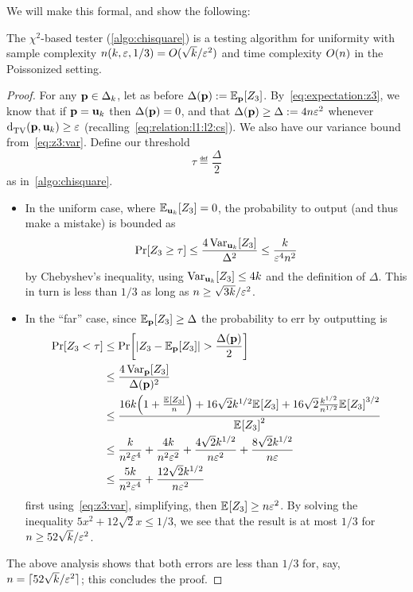 We will make this formal, and show the following:
\begin{theorem}
  \label{theo:z3}
The $\chi^2$-based tester (\cref{algo:chisquare}) is a testing algorithm for uniformity with sample complexity $n(k,\varepsilon,1/3) = O(\sqrt{k}/\varepsilon^2)$ and time complexity $O(n)$ in the Poissonized setting.
\end{theorem}
\begin{proof}
For any $\mathbf{p}\in\Delta_{k}$, let as before $\Delta(\p) \eqdef \bE{\p}{Z_3}$. By~\cref{eq:expectation:z3}, we know that if $\mathbf{p}=\mathbf{u}_k$ then $\Delta(\mathbf{p})=0$, and that $\Delta(\mathbf{p}) \geq \Delta := 4n\varepsilon^2$ whenever $\totalvardist{\p}{\uniform_\ab} \geq \dst$ (recalling~\cref{eq:relation:l1:l2:cs}). We also have our variance bound from~\cref{eq:z3:var}. Define our threshold
\[
    \tau \eqdef \frac{\Delta}{2}
\]
as in~\cref{algo:chisquare}.
\begin{itemize}
    \item In the uniform case, where $\bE{\uniform_\ab}{Z_3}=0$, the probability to output \reject (and thus make a mistake) is bounded as
    \[
    \bPr{Z_3 \geq \tau} \leq \frac{4\Var_{\uniform_\ab}[Z_3]}{\Delta^2}
    \leq \frac{\ab}{\dst^4\ns^2}
    \]
    by Chebyshev's inequality, using $\operatorname{Var}_{\mathbf{u}_k}[Z_3] \leq 4k$ and the definition of $\Delta$. This in turn is less than $1/3$ as long as $n \geq \sqrt{3k}/\varepsilon^2$.
    \item In the ``far'' case, since $\bE{\p}{Z_3} \geq \Delta$ the probability to err by outputting \accept is
    \begin{align*}
        \bPr{Z_3 < \tau} %
        &\leq \bPr{\abs{Z_3 - \bE{\p}{Z_3}} > \frac{\Delta(\p)}{2} } \\
        &\leq \frac{4\Var_{\p}[Z_3]}{\Delta(\p)^2} \\
        &\leq \frac{16\ab\Paren{ 1 + \frac{\bEE{Z_3}}{\ns}  } + 16\sqrt{2}\ab^{1/2}\bEE{Z_3}+16\sqrt{2}\frac{\ab^{1/2}}{\ns^{1/2}} \bEE{Z_3}^{3/2}}{\bEE{Z_3}^2} \\
        &\leq \frac{\ab}{\ns^2\dst^4} + \frac{4\ab}{\ns^2\dst^2} + \frac{4\sqrt{2}\ab^{1/2}}{\ns\dst^2}+\frac{8\sqrt{2}\ab^{1/2}}{\ns\dst} \\
        &\leq \frac{5\ab}{\ns^2\dst^4} + \frac{12\sqrt{2}\ab^{1/2}}{\ns\dst^2}
    \end{align*}
    first using~\cref{eq:z3:var}, simplifying, then $\bEE{Z_3}\geq \ns\dst^2$. By solving the inequality $5x^2 + 12\sqrt{2}x \leq 1/3$, we see that the result is at most $1/3$ for $n \geq 52\sqrt{k}/\varepsilon^2$.
  \end{itemize}
  The above analysis shows that both errors are less than $1/3$ for, say, $\ns = \lceil{52\sqrt{\ab}/\dst^2}\rceil$; this concludes the proof.
\end{proof}

